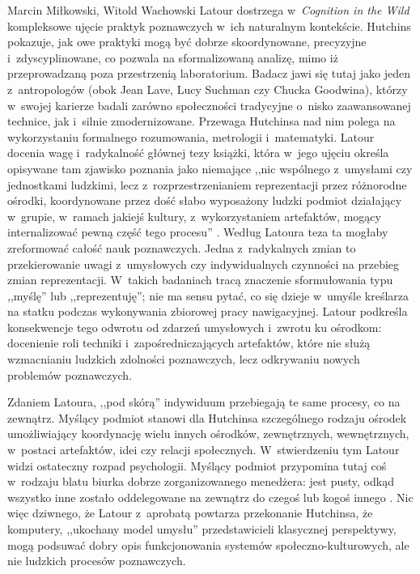 \begin{artplenv2auth}{Marcin Miłkowski, Witold Wachowski}
Latour dostrzega w~\textit{Cognition in the Wild} kompleksowe ujęcie praktyk poznawczych w~ich naturalnym kontekście. Hutchins pokazuje, jak owe praktyki mogą być dobrze skoordynowane, precyzyjne i~zdyscyplinowane, co pozwala na sformalizowaną analizę, mimo iż przeprowadzaną poza przestrzenią laboratorium. Badacz jawi się tutaj jako jeden z~antropologów (obok Jean Lave, Lucy Suchman czy Chucka Goodwina), którzy w~swojej karierze badali zarówno społeczności tradycyjne o~nisko zaawansowanej technice, jak i~silnie zmodernizowane. Przewaga Hutchinsa nad nim polega na wykorzystaniu formalnego rozumowania, metrologii i~matematyki. Latour docenia wagę i~radykalność głównej tezy książki, która w~jego ujęciu określa opisywane tam zjawisko poznania jako niemające ,,nic wspólnego z~umysłami czy jednostkami ludzkimi, lecz z~rozprzestrzenianiem reprezentacji przez różnorodne ośrodki, koordynowane przez dość słabo wyposażony ludzki podmiot działający w~grupie, w~ramach jakiejś kultury, z~wykorzystaniem artefaktów, mogący internalizować pewną część tego procesu''
\parencite[][s.~56]{latour_cogito_1996}. %
 Według Latoura teza ta mogłaby zreformować całość nauk poznawczych. Jedna z~radykalnych zmian to przekierowanie uwagi z~umysłowych czy indywidualnych czynności na przebieg zmian reprezentacji. W~takich badaniach tracą znaczenie sformułowania typu ,,myślę'' lub ,,reprezentuję''; nie ma sensu pytać, co się dzieje w~umyśle kreślarza na statku podczas wykonywania zbiorowej pracy nawigacyjnej. Latour podkreśla konsekwencje tego odwrotu od zdarzeń umysłowych i~zwrotu ku ośrodkom: docenienie roli techniki i~zapośredniczających artefaktów, które nie służą wzmacnianiu ludzkich zdolności poznawczych, lecz odkrywaniu nowych problemów poznawczych.

Zdaniem Latoura, ,,pod skórą'' indywiduum przebiegają te same procesy, co na zewnątrz. Myślący podmiot stanowi dla Hutchinsa szczególnego rodzaju ośrodek umożliwiający koordynację wielu innych ośrodków, zewnętrznych, wewnętrznych, w~postaci artefaktów, idei czy relacji społecznych. W~stwierdzeniu tym Latour widzi ostateczny rozpad psychologii. Myślący podmiot przypomina tutaj coś w~rodzaju blatu biurka dobrze zorganizowanego menedżera: jest pusty, odkąd wszystko inne zostało oddelegowane na zewnątrz do czegoś lub kogoś innego
\parencite[][s.~59]{latour_cogito_1996}. %
 Nic więc dziwnego, że Latour z~aprobatą powtarza przekonanie Hutchinsa, że komputery, ,,ukochany model umysłu'' przedstawicieli klasycznej perspektywy, mogą podsuwać dobry opis funkcjonowania systemów społeczno-kulturowych, ale nie ludzkich procesów poznawczych.


\end{artplenv2auth}

